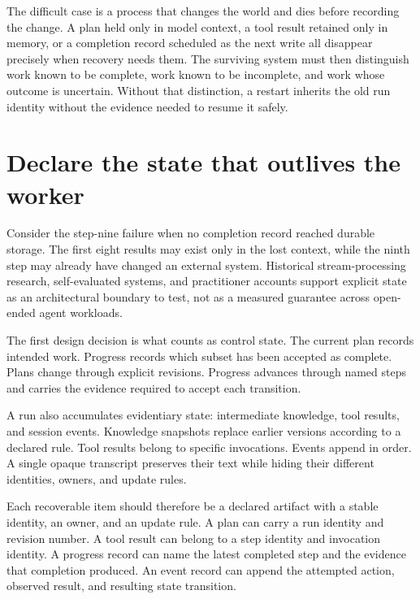 The difficult case is a process that changes the world and dies before recording the change. A plan held only in model context, a tool result retained only in memory, or a completion record scheduled as the next write all disappear precisely when recovery needs them. The surviving system must then distinguish work known to be complete, work known to be incomplete, and work whose outcome is uncertain. Without that distinction, a restart inherits the old run identity without the evidence needed to resume it safely.

\hypertarget{declare-the-state-that-outlives-the-worker}{%
\section{Declare the state that outlives the worker}\label{declare-the-state-that-outlives-the-worker}}

Consider the step-nine failure when no completion record reached durable storage. The first eight results may exist only in the lost context, while the ninth step may already have changed an external system. Historical stream-processing research, self-evaluated systems, and practitioner accounts support explicit state as an architectural boundary to test, not as a measured guarantee across open-ended agent workloads.

The first design decision is what counts as control state. The current plan records intended work. Progress records which subset has been accepted as complete. Plans change through explicit revisions. Progress advances through named steps and carries the evidence required to accept each transition.

A run also accumulates evidentiary state: intermediate knowledge, tool results, and session events. Knowledge snapshots replace earlier versions according to a declared rule. Tool results belong to specific invocations. Events append in order. A single opaque transcript preserves their text while hiding their different identities, owners, and update rules.

Each recoverable item should therefore be a declared artifact with a stable identity, an owner, and an update rule. A plan can carry a run identity and revision number. A tool result can belong to a step identity and invocation identity. A progress record can name the latest completed step and the evidence that completion produced. An event record can append the attempted action, observed result, and resulting state transition.

